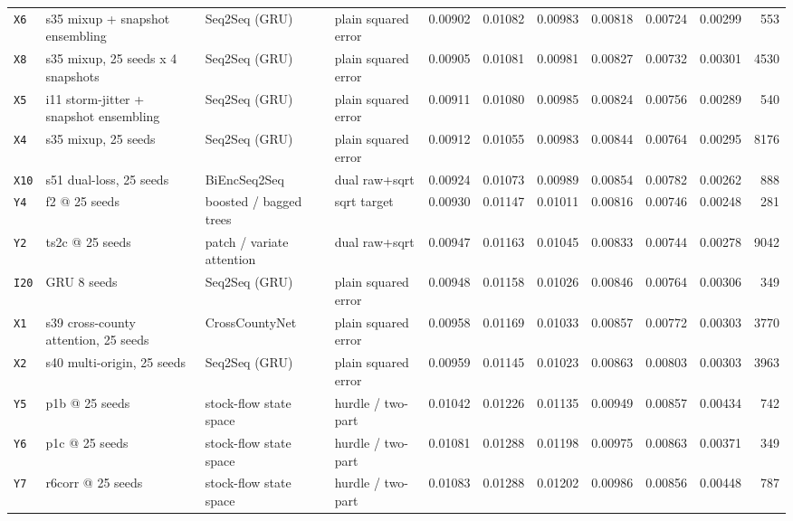 \documentclass[9pt,landscape]{article}
\begin{document}
\begin{longtable}{@{}p{1.1cm}p{5.4cm}p{3.1cm}p{2.7cm}rrrrrrr@{}}
\texttt{X6} & s35 mixup + snapshot ensembling & Seq2Seq (GRU) & plain squared error & 0.00902 & 0.01082 & 0.00983 & 0.00818 & 0.00724 & 0.00299 & 553 \\
\texttt{X8} & s35 mixup, 25 seeds x 4 snapshots & Seq2Seq (GRU) & plain squared error & 0.00905 & 0.01081 & 0.00981 & 0.00827 & 0.00732 & 0.00301 & 4530 \\
\texttt{X5} & i11 storm-jitter + snapshot ensembling & Seq2Seq (GRU) & plain squared error & 0.00911 & 0.01080 & 0.00985 & 0.00824 & 0.00756 & 0.00289 & 540 \\
\rowcolor{gray!15}\texttt{X4} & s35 mixup, 25 seeds & Seq2Seq (GRU) & plain squared error & 0.00912 & 0.01055 & 0.00983 & 0.00844 & 0.00764 & 0.00295 & 8176 \\
\texttt{X10} & s51 dual-loss, 25 seeds & BiEncSeq2Seq & dual raw+sqrt & 0.00924 & 0.01073 & 0.00989 & 0.00854 & 0.00782 & 0.00262 & 888 \\
\texttt{Y4} & f2 @ 25 seeds & boosted / bagged trees & sqrt target & 0.00930 & 0.01147 & 0.01011 & 0.00816 & 0.00746 & 0.00248 & 281 \\
\texttt{Y2} & ts2c @ 25 seeds & patch / variate attention & dual raw+sqrt & 0.00947 & 0.01163 & 0.01045 & 0.00833 & 0.00744 & 0.00278 & 9042 \\
\texttt{I20} & GRU 8 seeds & Seq2Seq (GRU) & plain squared error & 0.00948 & 0.01158 & 0.01026 & 0.00846 & 0.00764 & 0.00306 & 349 \\
\texttt{X1} & s39 cross-county attention, 25 seeds & CrossCountyNet & plain squared error & 0.00958 & 0.01169 & 0.01033 & 0.00857 & 0.00772 & 0.00303 & 3770 \\
\texttt{X2} & s40 multi-origin, 25 seeds & Seq2Seq (GRU) & plain squared error & 0.00959 & 0.01145 & 0.01023 & 0.00863 & 0.00803 & 0.00303 & 3963 \\
\texttt{Y5} & p1b @ 25 seeds & stock-flow state space & hurdle / two-part & 0.01042 & 0.01226 & 0.01135 & 0.00949 & 0.00857 & 0.00434 & 742 \\
\texttt{Y6} & p1c @ 25 seeds & stock-flow state space & hurdle / two-part & 0.01081 & 0.01288 & 0.01198 & 0.00975 & 0.00863 & 0.00371 & 349 \\
\texttt{Y7} & r6corr @ 25 seeds & stock-flow state space & hurdle / two-part & 0.01083 & 0.01288 & 0.01202 & 0.00986 & 0.00856 & 0.00448 & 787 \\
\bottomrule\end{longtable}
\end{document}
